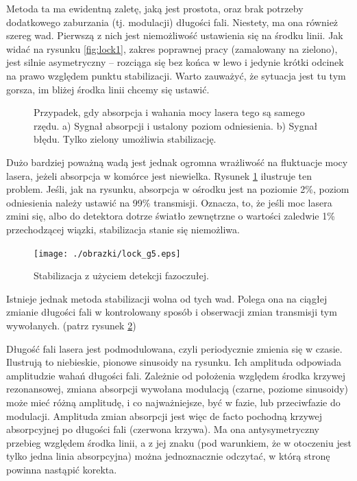 \documentclass[a4paper,10pt]{article}
\begin{document}
Metoda ta ma ewidentną zaletę, jaką jest prostota, oraz brak potrzeby dodatkowego zaburzania (tj. modulacji) długości fali.
Niestety, ma ona również szereg wad. Pierwszą z nich jest niemożliwość ustawienia się na środku linii. Jak widać na
rysunku \ref{fig:lock1}, zakres poprawnej pracy (zamalowany na zielono), jest silnie asymetryczny -- rozciąga się 
bez końca w lewo i jedynie krótki odcinek na prawo względem punktu stabilizacji. Warto zauważyć, że sytuacja jest tu tym gorsza, im
bliżej środka linii chcemy się ustawić.

\begin{figure}
\caption{Przypadek, gdy absorpcja i wahania mocy lasera tego są samego rzędu. a) Sygnał absorpcji i ustalony poziom odniesienia. b) Sygnał błędu. Tylko zielony umożliwia stabilizację. }
\label{fig:lock2}
\end{figure} 


Dużo bardziej poważną wadą jest jednak ogromna wrażliwość na fluktuacje mocy lasera, jeżeli absorpcja w komórce jest niewielka.
Rysunek \ref{fig:lock2} ilustruje ten problem. Jeśli, jak na rysunku, absorpcja w ośrodku jest na poziomie 2\%, poziom odniesienia
należy ustawić na 99\% transmisji. Oznacza, to, że jeśli moc lasera zmini się, albo do detektora dotrze światło zewnętrzne o wartości
zaledwie 1\% przechodzącej wiązki, stabilizacja stanie się niemożliwa.

\begin{figure}

\texttt{[image: ./obrazki/lock\_g5.eps]}
\caption{Stabilizacja z użyciem detekcji fazoczułej.}
\label{fig:lock3}
\end{figure} 

Istnieje jednak metoda stabilizacji wolna od tych wad.
Polega ona na ciągłej zmianie długości fali w kontrolowany sposób i obserwacji zmian transmisji tym wywołanych. (patrz rysunek \ref{fig:lock3})

 Długość fali lasera jest podmodulowana, czyli periodycznie zmienia się w czasie. Ilustrują to niebieskie, pionowe sinusoidy na rysunku. Ich amplituda odpowiada amplitudzie wahań długości fali.
  Zależnie od położenia względem środka krzywej rezonansowej, zmiana absorpcji wywołana modulacją (czarne, poziome sinusoidy) może mieć
 różną amplitudę, i co najważniejsze, być w fazie, lub przeciwfazie do modulacji.
  Amplituda zmian absorpcji jest więc de facto pochodną krzywej absorpcyjnej po długości fali (czerwona krzywa). 
  Ma ona antysymetryczny przebieg względem środka linii, a z jej znaku (pod warunkiem, że w otoczeniu jest tylko jedna linia absorpcyjna)
 można jednoznacznie odczytać, w którą stronę powinna nastąpić korekta.
 
\end{document}
